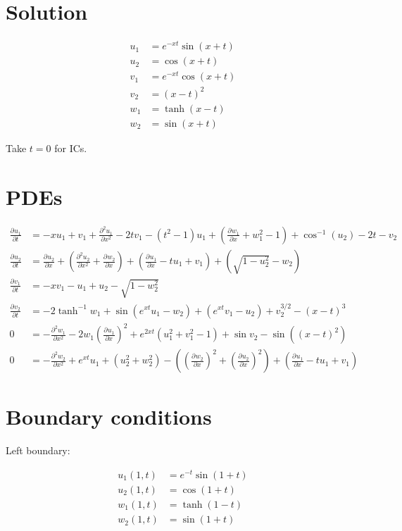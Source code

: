\documentclass{article}
\providecommand*{\pder}[3][]{ \frac{\partial^{#1}#2}{\partial #3^{#1}} }
\begin{document}
\section{Solution}
\begin{align*}
  u_1 & = e^{-xt}\sin\left(x+t\right) \\
  u_2 & = \cos\left(x+t\right) \\
  v_1 & = e^{-xt}\cos\left(x+t\right) \\
  v_2 & = \left(x-t\right)^2 \\
  w_1 & = \tanh\left(x-t\right) \\
  w_2 & = \sin\left(x+t\right)
\end{align*}

Take $t=0$ for ICs.

\section{PDEs}
\label{sec:pdes}

\begin{align*}
  \pder{u_1}{t} & = -xu_1 + v_1 + \pder[2]{u_1}{x} - 2tv_1 - \left(t^2-1\right)u_1 + \left(\pder{w_1}{x} + w_1^2 - 1\right) + \cos^{-1}\left(u_2\right) - 2t - v_2 \\
  \pder{u_2}{t} & = \pder{u_2}{x} + \left(\pder[2]{u_2}{x} + \pder{w_2}{x}\right) + \left(\pder{u_1}{x} - tu_1 + v_1\right) + \left(\sqrt{1-u_2^2} - w_2\right) \\
  \pder{v_1}{t} & = -xv_1 - u_1 + u_2 - \sqrt{1-w_2^2} \\
  \pder{v_2}{t} & = -2\tanh^{-1}w_1 + \sin\left(e^{xt}u_1-w_2\right) + \left(e^{xt}v_1-u_2\right) + v_2^{3/2}-\left(x-t\right)^3 \\
  0 & = -\pder[2]{w_1}{x} - 2w_1\left(\pder{u_1}{x}\right)^2 + e^{2xt}\left(u_1^2+v_1^2-1\right) + \sin{v_2} - \sin\left(\left(x-t\right)^2\right) \\
  0 & = -\pder[2]{w_2}{x} + e^{xt}u_1 + \left(u_2^2+w_2^2\right) - \left(\left(\pder{w_2}{x}\right)^2+\left(\pder{u_2}{x}\right)^2\right) + \left(\pder{u_1}{x} -tu_1+v_1\right)
\end{align*}

\section{Boundary conditions}
\label{sec:boundary-conditions}

Left boundary:

\begin{align*}
  u_1(1,t) & = e^{-t}\sin(1+t) \\
  u_2(1,t) & = \cos(1+t) \\
  w_1(1,t) & = \tanh(1-t) \\
  w_2(1,t) & = \sin(1+t) \\
\end{align*}
\end{document}
